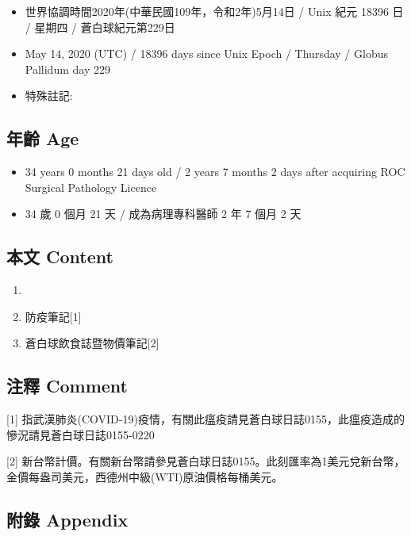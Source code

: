 \documentclass[
]{article}
\providecommand{\tightlist}{%
  \setlength{\itemsep}{0pt}\setlength{\parskip}{0pt}}
\begin{document}
\begin{itemize}
\tightlist
\item
  世界協調時間2020年(中華民國109年，令和2年)5月14日 / Unix 紀元 18396 日
  / 星期四 / 蒼白球紀元第229日
\item
  May 14, 2020 (UTC) / 18396 days since Unix Epoch / Thursday / Globus
  Pallidum day 229
\item
  特殊註記:
\end{itemize}

\hypertarget{ux5e74ux9f61-age-13}{%
\subsection{年齡 Age}\label{ux5e74ux9f61-age-13}}

\begin{itemize}
\tightlist
\item
  34 years 0 months 21 days old / 2 years 7 months 2 days after
  acquiring ROC Surgical Pathology Licence
\item
  34 歲 0 個月 21 天 / 成為病理專科醫師 2 年 7 個月 2 天
\end{itemize}

\hypertarget{ux672cux6587-content-13}{%
\subsection{本文 Content}\label{ux672cux6587-content-13}}

\begin{enumerate}
\def\labelenumi{\arabic{enumi}.}
\item
\item
  防疫筆記{[}1{]}
\item
  蒼白球飲食誌暨物價筆記{[}2{]}
\end{enumerate}

\hypertarget{ux6ce8ux91cb-comment-13}{%
\subsection{注釋 Comment}\label{ux6ce8ux91cb-comment-13}}

{[}1{]}
指武漢肺炎(COVID-19)疫情，有關此瘟疫請見蒼白球日誌0155，此瘟疫造成的慘況請見蒼白球日誌0155-0220

{[}2{]}
新台幣計價。有關新台幣請參見蒼白球日誌0155。此刻匯率為1美元兌新台幣，金價每盎司美元，西德州中級(WTI)原油價格每桶美元。

\hypertarget{ux9644ux9304-appendix-13}{%
\subsection{附錄 Appendix}\label{ux9644ux9304-appendix-13}}
\end{document}
